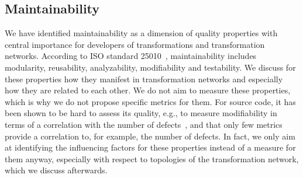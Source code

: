 \subsection{Maintainability}

We have identified maintainability as a dimension of quality properties with central importance for developers of transformations and transformation networks.
According to ISO standard 25010~\cite{iso25010}, maintainability includes modularity, reusability, analyzability, modifiability and testability.
We discuss for these properties how they manifest in transformation networks and especially how they are related to each other.
We do not aim to measure these properties, which is why we do not propose specific metrics for them.
For source code, it has been shown to be hard to assess its quality, e.g., to measure modifiability in terms of a correlation with the number of defects~\cite{Gyimothy2005ValidationMetrics-TSE, Yu2002FaultPrediction-ECSMR}, and that only few metrics provide a correlation to, for example, the number of defects.
In fact, we only aim at identifying the influencing factors for these properties instead of a measure for them anyway, especially with respect to topologies of the transformation network, which we discuss afterwards.

